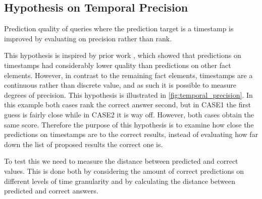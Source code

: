 \subsection{Hypothesis on Temporal Precision}
\label{sec:hypothesis_temporal_precision}

\begin{hypothesis}
\label{hyp:temporal_precision}
Prediction quality of queries where the prediction target is a timestamp is improved by evaluating on precision rather than rank.
\end{hypothesis}



This hypothesis is inspired by prior work \cite{P9}, which showed that predictions on timestamps had considerably lower quality than predictions on other fact elements.
However, in contrast to the remaining fact elements, timestamps are a continuous rather than discrete value, and as such it is possible to measure degrees of precision.
This hypothesis is illustrated in \autoref{fig:temporal_precision}. In this example both cases rank the correct answer second, but in CASE1 the first guess is fairly close while in CASE2 it is way off. However, both cases obtain the same score.
Therefore the purpose of this hypothesis is to examine how close the  predictions on timestamps are to the correct results, instead of evaluating how far down the list of proposed results the correct one is.

To test this we need to measure the distance between predicted and correct values.
This is done both by considering the amount of correct predictions on different levels of time granularity and by calculating the distance between predicted and correct answers.